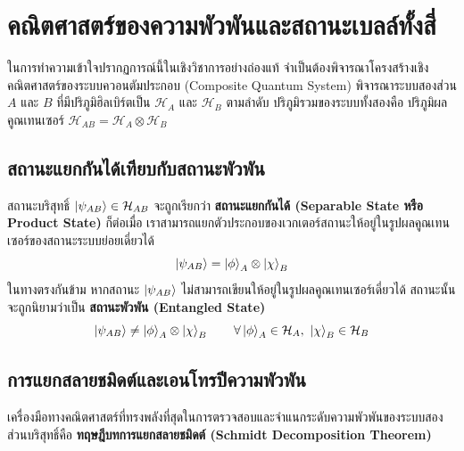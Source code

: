 \section{คณิตศาสตร์ของความพัวพันและสถานะเบลล์ทั้งสี่}

ในการทำความเข้าใจปรากฏการณ์นี้ในเชิงวิชาการอย่างถ่องแท้ จำเป็นต้องพิจารณาโครงสร้างเชิงคณิตศาสตร์ของระบบควอนตัมประกอบ (Composite Quantum System) พิจารณาระบบสองส่วน $A$ และ $B$ ที่มีปริภูมิฮิลเบิร์ตเป็น $\mathcal{H}_A$ และ $\mathcal{H}_B$ ตามลำดับ ปริภูมิรวมของระบบทั้งสองคือ ปริภูมิผลคูณเทนเซอร์ $\mathcal{H}_{AB} = \mathcal{H}_A \otimes \mathcal{H}_B$

\subsection{สถานะแยกกันได้เทียบกับสถานะพัวพัน}
สถานะบริสุทธิ์ $\ket{\psi_{AB}} \in \mathcal{H}_{AB}$ จะถูกเรียกว่า \textbf{สถานะแยกกันได้ (Separable State หรือ Product State)} ก็ต่อเมื่อ เราสามารถแยกตัวประกอบของเวกเตอร์สถานะให้อยู่ในรูปผลคูณเทนเซอร์ของสถานะระบบย่อยเดี่ยวได้
\begin{equation}
\ket{\psi_{AB}} = \ket{\phi}_A \otimes \ket{\chi}_B
\label{eq:separable_state}
\end{equation}
ในทางตรงกันข้าม หากสถานะ $\ket{\psi_{AB}}$ ไม่สามารถเขียนให้อยู่ในรูปผลคูณเทนเซอร์เดี่ยวได้ สถานะนั้นจะถูกนิยามว่าเป็น \textbf{สถานะพัวพัน (Entangled State)}
\begin{equation}
\ket{\psi_{AB}} \ne \ket{\phi}_A \otimes \ket{\chi}_B \qquad \forall \ket{\phi}_A \in \mathcal{H}_A, \ \ket{\chi}_B \in \mathcal{H}_B
\end{equation}

\subsection{การแยกสลายชมิดต์และเอนโทรปีความพัวพัน}
เครื่องมือทางคณิตศาสตร์ที่ทรงพลังที่สุดในการตรวจสอบและจำแนกระดับความพัวพันของระบบสองส่วนบริสุทธิ์คือ \textbf{ทฤษฎีบทการแยกสลายชมิดต์ (Schmidt Decomposition Theorem)}

